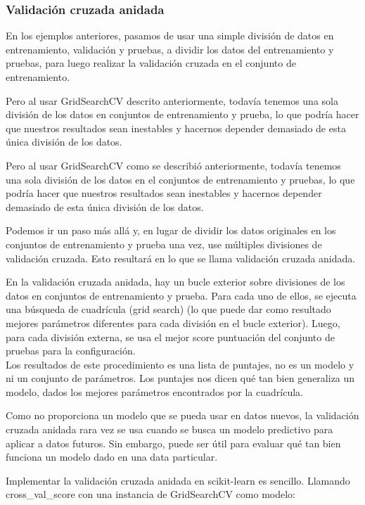 {\subsubsection{Validación cruzada anidada}


En los ejemplos anteriores, pasamos de usar una simple  división de datos en entrenamiento,
validación y pruebas, a dividir los datos del entrenamiento y pruebas, para luego realizar la validación cruzada en el conjunto de entrenamiento. 

Pero al usar GridSearchCV  descrito anteriormente, todavía tenemos una sola división de los datos en conjuntos de entrenamiento y prueba,
lo que podría hacer que nuestros resultados sean inestables y hacernos depender demasiado de esta única división de los datos. 

Pero al usar {\ttfamily GridSearchCV} como se describió anteriormente, todavía tenemos una sola división de los datos en el conjuntos de entrenamiento y pruebas, lo que podría hacer que nuestros resultados sean inestables y hacernos depender demasiado de esta única división de los datos.

Podemos ir un paso más allá y, en lugar de dividir los datos originales en los conjuntos 
de entrenamiento y prueba una vez, use múltiples divisiones de validación cruzada. 
Esto resultará en lo que se llama validación cruzada anidada.

En la validación cruzada anidada, hay un bucle exterior sobre divisiones  de los datos en conjuntos de entrenamiento y prueba. Para cada uno de ellos, se ejecuta  una búsqueda de cuadrícula  (grid search)
(lo que puede dar como resultado mejores parámetros  diferentes  para cada división en el bucle exterior).    Luego, para cada división externa, se usa el  mejor  score  puntuación del conjunto de pruebas para la  configuración. \\

Los resultados de este procedimiento es una lista de puntajes, no es un modelo y ni un conjunto de parámetros.   Los puntajes nos dicen qué tan bien generaliza un modelo, dados los mejores parámetros encontrados  por la cuadrícula.


Como no proporciona un modelo que se pueda usar en datos nuevos, la validación cruzada anidada rara vez se usa cuando se busca un modelo predictivo para aplicar a datos futuros.
Sin embargo, puede ser útil para evaluar qué tan bien funciona un modelo dado en una data particular. 

Implementar la validación cruzada anidada en {\ttfamily scikit-learn} es sencillo.  Llamando {\ttfamily 
cross\_val\_score} con una instancia de {\ttfamily GridSearchCV} como modelo:


}
